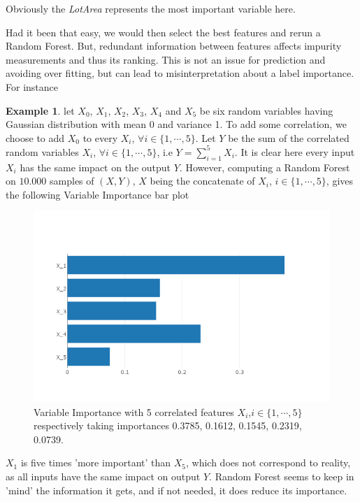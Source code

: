 \documentclass[english,11pt,openany]{report}
\theoremstyle{definition}
\theoremstyle{plain}
\theoremstyle{definition}
\newtheorem{Ex}[Th]{Example}
\begin{document}
\begin{appendices}
Obviously the \textit{LotArea} represents the most important variable here.  



Had it been that easy, we would then select the best features and rerun a Random Forest. 
But, redundant information between features affects impurity measurements and thus its ranking. 
This is not an issue for prediction and avoiding over fitting, but can lead to misinterpretation about a label importance. 
\newline
For instance

\begin{Ex}
	let $X_0$, $X_1$, $X_2$,  $X_3$, $X_4$ and $X_5$ be six random variables having Gaussian distribution with mean 0 and variance 1.
	To add some correlation, we choose to add $X_0$ to every $X_i$,  $\forall i \in \{1,\cdots, 5\}$. 
	Let $Y$ be the sum of the correlated random variables $X_i$, $\forall i \in \{1,\cdots, 5\}$, i.e $Y = \sum_{i=1}^{5} X_i$. 
	It is clear here every input $X_i$ has the same impact on the output $Y$. 
	However, computing a Random Forest on $10.000$ samples of $(X, Y)$, $X$ being the concatenate of $X_i$, $i \in \{1,\cdots, 5\}$, gives the following Variable Importance bar plot
	\begin{figure}[H]
		\centering
		\label{figure:vi_ce}
		\includegraphics[scale=0.4]{RF_analysis/vi_contre_example.png} 
		\caption{Variable Importance with 5 correlated features $X_i$,$i \in \{1,\cdots, 5\}$ respectively taking importances 0.3785, 0.1612, 0.1545, 0.2319, 0.0739.}
	\end{figure}

	$X_1$ is five times 'more important' than $X_5$, which does not correspond to reality, as all inputs have the same impact on output $Y$. Random Forest seems to keep in 'mind' the information it gets, and if not needed, it does reduce its importance.  


\end{Ex}
\end{appendices}
\end{document}
